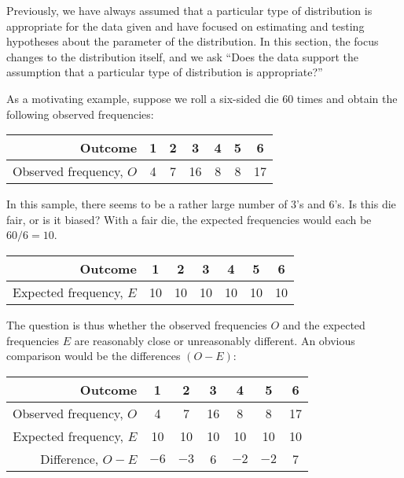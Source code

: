 Previously, we have always assumed that a particular type of distribution is appropriate for the data given and have focused on estimating and testing hypotheses about the parameter of the distribution. In this section, the focus changes to the distribution itself, and we ask ``Does the data support the assumption that a particular type of distribution is appropriate?''

As a motivating example, suppose we roll a six-sided die 60 times and obtain the following observed frequencies:

\begin{table}[H]
    \centering
    \begin{tabular}{|c|c|c|c|c|c|c|}
    \hline
    \multicolumn{1}{|r|}{Outcome} & 1 & 2 & 3 & 4 & 5 & 6 \\ \hline
    Observed frequency, $O$ & 4 & 7 & 16 & 8 & 8 & 17 \\ \hline
    \end{tabular}
\end{table}

In this sample, there seems to be a rather large number of 3's and 6's. Is this die fair, or is it biased? With a fair die, the expected frequencies would each be $60/6 = 10$.

\begin{table}[H]
    \centering
    \begin{tabular}{|c|c|c|c|c|c|c|}
    \hline
    \multicolumn{1}{|r|}{Outcome} & 1 & 2 & 3 & 4 & 5 & 6 \\ \hline
    Expected frequency, $E$ & 10 & 10 & 10 & 10 & 10 & 10 \\ \hline
    \end{tabular}
\end{table}

The question is thus whether the observed frequencies $O$ and the expected frequencies $E$ are reasonably close or unreasonably different. An obvious comparison would be the differences $(O-E)$:

\begin{table}[H]
    \centering
    \begin{tabular}{|r|c|c|c|c|c|c|}
    \hline
    Outcome & 1 & 2 & 3 & 4 & 5 & 6 \\ \hline
    Observed frequency, $O$ & 4 & 7 & 16 & 8 & 8 & 17 \\ \hline
    Expected frequency, $E$ & 10 & 10 & 10 & 10 & 10 & 10 \\ \hline
    Difference, $O-E$ & $-6$ & $-3$ & 6 & $-2$ & $-2$ & 7 \\ \hline
    \end{tabular}
\end{table}

